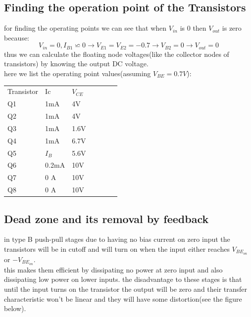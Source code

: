 \documentclass[11pt]{article}
\begin{document}
\subsection{Finding the operation point of the Transistors}
for finding the operating points we can see that when $V_{in}$ is 0 then $V_{out}$ is zero
because: \\
$$ V_{in} = 0, I_{B1} \backsimeq 0 \rightarrow V_{E1} = V_{E2}  = -0.7 \rightarrow V_{B2} = 0 \rightarrow V_{out} = 0 $$
thus we can calculate the floating node voltages(like the collector nodes of transistors) by knowing the output
DC voltage. \\
here we list the operating point values(assuming $V_{BE} = 0.7V$): \\
\begin{table}[H]
    \begin{tabular}{lllllll}
    Transistor & Ic         & $V_{CE}$ \\
    Q1         & 1mA         & 4V      \\
    Q2         & 1mA         & 4V      \\
    Q3         & 1mA         & 1.6V    \\
    Q4         & 1mA         & 6.7V    \\
    Q5         & $I_B$       & 5.6V    \\
    Q6         & 0.2mA       & 10V     \\
    Q7         & 0 A         & 10V     \\
    Q8         & 0 A         & 10V     \\
    \end{tabular}
\end{table}


\subsection{Dead zone and its removal by feedback}
in type B push-pull stages due to having no bias current on zero input the transistors
will be in cutoff and will turn on when the input either reaches $V_{BE_{on}}$ or $-V_{BE_{on}}$. \\
this makes them efficient by dissipating no power at zero input and also dissipating low power on
lower inputs. the disadvantage to these stages is that until the input turns on the transistor
the output will be zero and their transfer characteristic won't be linear and they will have
some distortion(see the figure below). \\    
\end{document}
